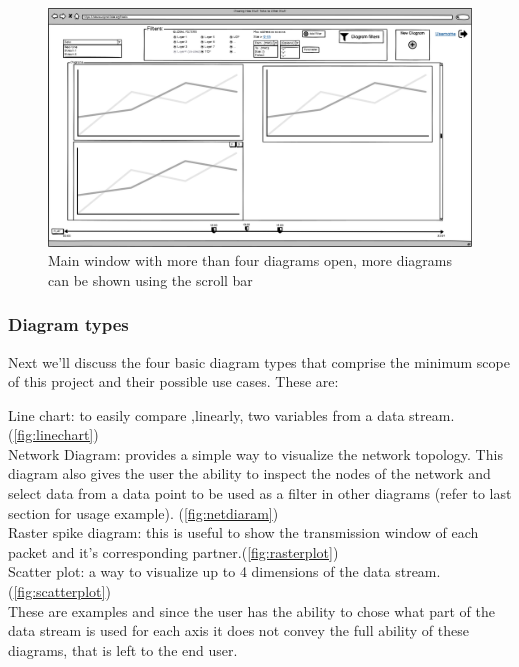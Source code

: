 \documentclass[twoside, english, draft]{Pflichtenheft}
\begin{document}
\begin{figure}[h]
	\centering
	\label{fig:mainWindow4}
	\includegraphics[width=\textwidth]{Images/06MW.png}
	\caption{Main window with more than four diagrams open, more diagrams can be shown using the scroll bar}
	\label{fig:mainWindow4}
\end{figure}

\clearpage

\subsubsection{Diagram types}



Next we'll discuss the four basic diagram types that comprise the minimum scope of this project and their possible use cases.
These are:

Line chart: to easily compare ,linearly, two variables from a data stream.(\autoref{fig:linechart})
\\
Network Diagram: provides a simple way to visualize the network topology. This diagram also gives the user the ability to inspect the nodes of the network and select data from a data point to be used as a filter in other diagrams (refer to last section for usage example).
(\autoref{fig:netdiaram})
\\
Raster spike diagram: this is useful to show the transmission window of each packet and it's corresponding partner.(\autoref{fig:rasterplot})
\\
Scatter plot: a way to visualize up to 4 dimensions of the data stream.(\autoref{fig:scatterplot})
\\
These are examples and since the user has the ability to chose what part of the data stream is used for each axis it does not convey the full ability of these diagrams, that is left to the end user.
\end{document}
